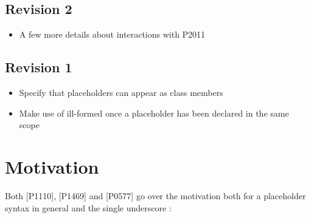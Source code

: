 \documentclass{wg21}
\begin{document}
\subsection{Revision 2}

\begin{itemize}
    \item A few more details about interactions with P2011
\end{itemize}

\subsection{Revision 1}

\begin{itemize}
   \item Specify that placeholders can appear as class members
   \item Make use of \tcode{_} ill-formed once a placeholder has been declared in the same scope 
\end{itemize}

\section{Motivation}

Both [P1110]\cite{P1110R0}, [P1469]\cite{P1469R0} and [P0577]\cite{P0577R0} go over the motivation both for a placeholder syntax in general and
the single underscore \tcode{_}:
\end{document}
